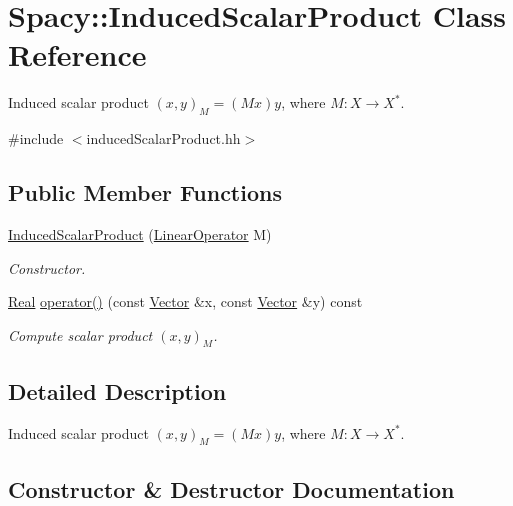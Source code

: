 \hypertarget{classSpacy_1_1InducedScalarProduct}{}\section{Spacy\+:\+:Induced\+Scalar\+Product Class Reference}
\label{classSpacy_1_1InducedScalarProduct}


Induced scalar product $(x,y)_M = (Mx)y$, where $M:X\rightarrow X^*$.  




{\ttfamily \#include $<$induced\+Scalar\+Product.\+hh$>$}

\subsection*{Public Member Functions}
\begin{DoxyCompactItemize}
\item 
\hyperlink{classSpacy_1_1InducedScalarProduct_a8cf4d6c0823b6c9d59be783d3627130e}{Induced\+Scalar\+Product} (\hyperlink{classSpacy_1_1LinearOperator}{Linear\+Operator} M)
\begin{DoxyCompactList}\small\item\em Constructor. \end{DoxyCompactList}\item 
\hyperlink{classSpacy_1_1Real}{Real} \hyperlink{classSpacy_1_1InducedScalarProduct_ab16021f05080b32714276f9b125df8af}{operator()} (const \hyperlink{classSpacy_1_1Vector}{Vector} \&x, const \hyperlink{classSpacy_1_1Vector}{Vector} \&y) const \hypertarget{classSpacy_1_1InducedScalarProduct_ab16021f05080b32714276f9b125df8af}{}\label{classSpacy_1_1InducedScalarProduct_ab16021f05080b32714276f9b125df8af}

\begin{DoxyCompactList}\small\item\em Compute scalar product $(x,y)_M$. \end{DoxyCompactList}\end{DoxyCompactItemize}


\subsection{Detailed Description}
Induced scalar product $(x,y)_M = (Mx)y$, where $M:X\rightarrow X^*$. 

\subsection{Constructor \& Destructor Documentation}
